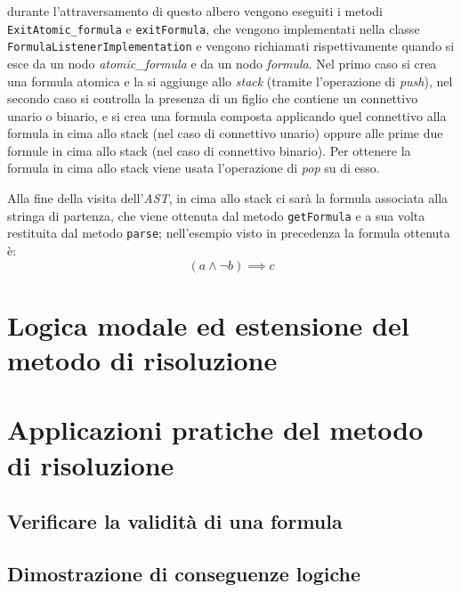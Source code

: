 \documentclass[a4paper,12pt]{report}
\begin{document}
durante l'attraversamento di questo albero vengono eseguiti i metodi \\ \texttt{ExitAtomic\_formula} e \texttt{exitFormula}, che vengono implementati nella classe \\ \texttt{FormulaListenerImplementation} e vengono richiamati rispettivamente quando si esce da un nodo \emph{atomic\_formula} e da un nodo \emph{formula}. Nel primo caso si crea una formula atomica e la si aggiunge allo \emph{stack} (tramite l'operazione di \emph{push}), nel secondo caso si controlla la presenza di un figlio che contiene un connettivo unario o binario, e si crea una formula composta applicando quel connettivo alla formula in cima allo stack (nel caso di connettivo unario) oppure alle prime due formule in cima allo stack (nel caso di connettivo binario). Per ottenere la formula in cima allo stack viene usata l'operazione di \emph{pop} su di esso.

Alla fine della visita dell'\emph{AST}, in cima allo stack ci sarà la formula associata alla stringa di partenza, che viene ottenuta dal metodo \texttt{getFormula} e a sua volta restituita dal metodo \texttt{parse}; nell'esempio visto in precedenza la formula ottenuta è:
\[ (a \land \lnot b) \implies c \]



















% 
% 
\chapter{Logica modale ed estensione del metodo di risoluzione}
\label{modal}



% 
% 
\chapter{Applicazioni pratiche del metodo di risoluzione}
\label{app}

\section{Verificare la validità di una formula}
\section{Dimostrazione di conseguenze logiche}
\end{document}

